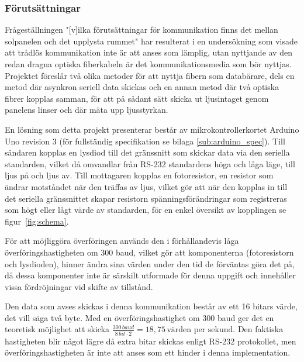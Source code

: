         \subsubsection{Förutsättningar} %
        \label{sub:forutsattningar}
                
            Frågeställningen "[v]ilka förutsättningar för kommunikation finns det mellan solpanelen och det upplysta rummet" har resulterat i en undersökning som visade att trådlös kommunikation inte är att anses som lämplig, utan nyttjande av den redan dragna optiska fiberkabeln är det kommunikationsmedia som bör nyttjas. Projektet föreslår två olika metoder för att nyttja fibern som databärare, dels en metod där asynkron seriell data skickas och en annan metod där två optiska fibrer kopplas samman, för att på sådant sätt skicka ut ljusintaget genom panelens linser och där mäta upp ljusstyrkan.\bigskip

            En lösning som detta projekt presenterar består av mikrokontrollerkortet Arduino Uno revision 3 (för fullständig specifikation se bilaga \ref{sub:arduino_spec})\cite{ardu}. Till sändaren kopplas en lysdiod till det gränssnitt som skickar data via den seriella standarden, vilket då omvandlar från RS-232 standardens höga och låga läge, till ljus på och ljus av. Till mottagaren kopplas en fotoresistor, en resistor som ändrar motståndet när den träffas av ljus, vilket gör att när den kopplas in till det seriella gränssnittet skapar resistorn spänningsförändringar som registreras som högt eller lågt värde av standarden, för en enkel översikt av kopplingen se figur~\ref{fig:schema}. \bigskip

            För att möjliggöra överföringen används den i förhållandevis låga överföringshastigheten om 300 baud, vilket gör att komponenterna (fotoresistorn och lysdioden), hinner ändra sina värden under den tid de förväntas göra det på, då dessa komponenter inte är särskilt utformade för denna uppgift och innehåller vissa fördröjningar vid skifte av tillstånd. \bigskip

            Den data som avses skickas i denna kommunikation består av ett 16 bitars värde, det vill säga två byte. Med en överföringshastighet om 300 baud ger det en teoretisk möjlighet att skicka $\frac{300 \,\textit{baud}}{8 \, bit \cdot 2} = 18,75 \, \text{värden per sekund}$. Den faktiska hastigheten blir något lägre då extra bitar skickas enligt RS-232 protokollet, men överföringshastigheten är inte att anses som ett hinder i denna implementation. \bigskip
            

